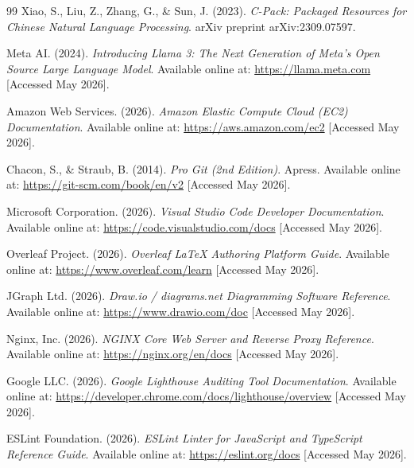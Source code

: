 \documentclass[12pt,a4paper]{report}
\begin{document}
\begin{thebibliography}{99}
Xiao, S., Liu, Z., Zhang, G., \& Sun, J. (2023). \textit{C-Pack: Packaged Resources for Chinese Natural Language Processing}. arXiv preprint arXiv:2309.07597.

Meta AI. (2024). \textit{Introducing Llama 3: The Next Generation of Meta's Open Source Large Language Model}. Available online at: \url{https://llama.meta.com} [Accessed May 2026].

Amazon Web Services. (2026). \textit{Amazon Elastic Compute Cloud (EC2) Documentation}. Available online at: \url{https://aws.amazon.com/ec2} [Accessed May 2026].

Chacon, S., \& Straub, B. (2014). \textit{Pro Git (2nd Edition)}. Apress. Available online at: \url{https://git-scm.com/book/en/v2} [Accessed May 2026].

Microsoft Corporation. (2026). \textit{Visual Studio Code Developer Documentation}. Available online at: \url{https://code.visualstudio.com/docs} [Accessed May 2026].

Overleaf Project. (2026). \textit{Overleaf LaTeX Authoring Platform Guide}. Available online at: \url{https://www.overleaf.com/learn} [Accessed May 2026].

JGraph Ltd. (2026). \textit{Draw.io / diagrams.net Diagramming Software Reference}. Available online at: \url{https://www.drawio.com/doc} [Accessed May 2026].

Nginx, Inc. (2026). \textit{NGINX Core Web Server and Reverse Proxy Reference}. Available online at: \url{https://nginx.org/en/docs} [Accessed May 2026].

Google LLC. (2026). \textit{Google Lighthouse Auditing Tool Documentation}. Available online at: \url{https://developer.chrome.com/docs/lighthouse/overview} [Accessed May 2026].

ESLint Foundation. (2026). \textit{ESLint Linter for JavaScript and TypeScript Reference Guide}. Available online at: \url{https://eslint.org/docs} [Accessed May 2026].

\end{thebibliography}
\end{document}
